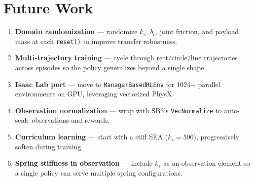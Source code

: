 \documentclass[11pt, a4paper]{article}
\begin{document}
\section{Future Work}

\begin{enumerate}
  \item \textbf{Domain randomization} --- randomize $k_s$, $b_c$,
        joint friction, and payload mass at each \texttt{reset()} to improve
        transfer robustness.
  \item \textbf{Multi-trajectory training} --- cycle through rect/circle/line
        trajectories across episodes so the policy generalizes beyond a single
        shape.
  \item \textbf{Isaac Lab port} --- move to \texttt{ManagerBasedRLEnv} for
        1024+ parallel environments on GPU, leveraging vectorized PhysX.
  \item \textbf{Observation normalization} --- wrap with SB3's
        \texttt{VecNormalize} to auto-scale observations and rewards.
  \item \textbf{Curriculum learning} --- start with a stiff SEA ($k_s = 500$),
        progressively soften during training.
  \item \textbf{Spring stiffness in observation} --- include $k_s$ as an
        observation element so a single policy can serve multiple spring
        configurations.
\end{enumerate}
\end{document}
